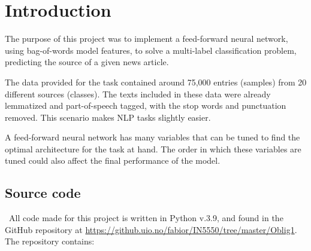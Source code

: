 \section{Introduction}
\label{chap:Introduction}

\quad The purpose of this project was to implement a feed-forward neural network, using bag-of-words model features, to solve a multi-label classification problem, predicting the source of a given news article.

The data provided for the task contained around 75,000 entries (samples) from 20 different sources (classes). The texts included in these data were already lemmatized and part-of-speech tagged, with the stop words and punctuation removed. This scenario makes NLP tasks slightly easier.

A feed-forward neural network has many variables that can be tuned to find the optimal architecture for the task at hand. The order in which these variables are tuned could also affect the final performance of the model.


\subsection{Source code}
\label{chap:Source code}

\quad \, All code made for this project is written in Python v.3.9, and found in the GitHub repository at \href{https://github.uio.no/fabior/IN5550/tree/master/Oblig1}{https://github.uio.no/fabior/IN5550/tree/master/Oblig1}. The repository contains:

